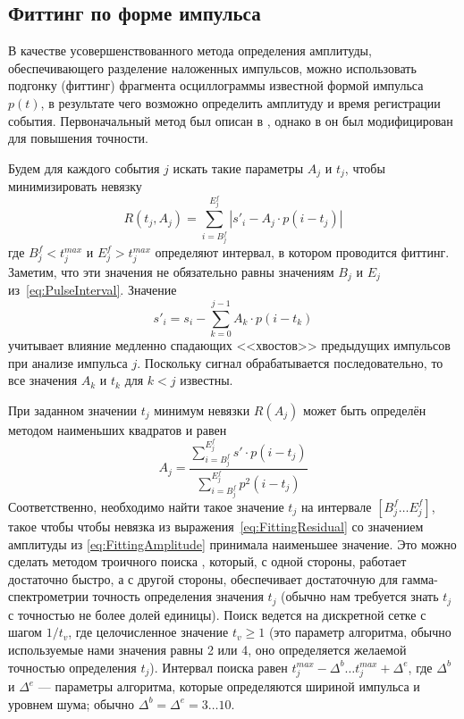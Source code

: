 
\FloatBarrier
\subsection{Фиттинг по форме импульса}
\label{sec:FittingProcessing}

В качестве усовершенствованного метода определения амплитуды, обеспечивающего разделение наложенных импульсов, можно использовать подгонку (фиттинг) фрагмента осциллограммы известной формой импульса $p(t)$, в результате чего возможно определить амплитуду и время регистрации события. Первоначальный метод был описан в \cite{Gin2008}, однако в \cite{Khilkevitch2020} он был модифицирован для повышения точности.

Будем для каждого события $j$ искать такие параметры $A_j$ и $t_j$, чтобы минимизировать невязку
\begin{equation}
  \label{eq:FittingResidual}
  R(t_j,A_j) =   \sum \limits_{i=B^f_j}^{E^f_j} \left| s'_i - A_j \cdot p( i - t_j ) \right|
\end{equation}
где $B^f_j < t_j^{max}$ и $E^f_j > t_j^{max}$ определяют интервал, в котором проводится фиттинг. Заметим, что эти значения не обязательно равны значениям $B_j$ и $E_j$ из~\ref{eq:PulseInterval}. Значение 
\begin{equation*}
  s'_i = s_i - \sum \limits_{k=0}^{j-1} A_k \cdot p( i - t_k )
\end{equation*}
учитывает влияние медленно спадающих <<хвостов>> предыдущих импульсов при анализе импульса $j$. Поскольку сигнал обрабатывается последовательно, то все значения $A_k$ и $t_k$ для $k<j$ известны.

При заданном значении $t_j$ минимум невязки $R(A_j)$ может быть определён методом наименьших квадратов и равен
\begin{equation}
  \label{eq:FittingAmplitude}
  A_j = \frac{ \sum \limits_{i=B^f_j}^{E^f_j} s' \cdot p(i - t_j) }{ \sum \limits_{i=B^f_j}^{E^f_j} p^2(i-t_j) }
\end{equation}
Соответственно, необходимо найти такое значение $t_j$ на интервале $\left[ B_j^f \ldots E_j^f \right] $, такое чтобы чтобы невязка из выражения~\ref{eq:FittingResidual} со значением амплитуды из \ref{eq:FittingAmplitude} принимала наименьшее значение. Это можно сделать методом троичного поиска \cite{Scherer2017}, который, с одной стороны, работает достаточно быстро, а с другой стороны, обеспечивает достаточную для гамма-спектрометрии точность определения значения $t_j$ (обычно нам требуется знать $t_j$ с точностью не более долей единицы). Поиск ведется на дискретной сетке с шагом $1/t_v$, где целочисленное значение $t_v \ge 1$ (это параметр алгоритма, обычно используемые нами значения равны 2 или 4, оно определяется желаемой точностью определения $t_j$). Интервал поиска равен $ t_j^{max} - \Delta^b \ldots  t_j^{max} + \Delta^e$, где $\Delta^b$ и $\Delta^e$ --- параметры алгоритма, которые определяются шириной импульса и уровнем шума; обычно $\Delta^b = \Delta^e = 3 \ldots 10$.

